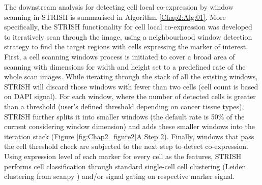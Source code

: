 The downstream analysis for detecting cell local co-expression by window scanning in STRISH is summarised in Algorithm \ref{Chap2:Alg:01}. More specifically, the STRISH functionality for cell local co-expression was developed to iteratively scan through the image, using a neighbourhood window detection strategy to find the target regions with cells expressing the marker of interest. First, a cell scanning windows process is initiated to cover a broad area of scanning with dimensions for width and height set to a predefined rate of the whole scan images. While iterating through the stack of all the existing windows, STRISH will discard those windows with fewer than two cells (cell count is based on DAPI signal). For each window, where the number of detected cells is greater than a threshold (user’s defined threshold depending on cancer tissue types), STRISH further splits it into smaller windows (the default rate is 50\% of the current considering window dimension) and adds these smaller windows into the iteration stack (Figure \ref{fig:Chap2_figure2}A Step 2). Finally, windows that pass the cell threshold check are subjected to the next step to detect co-expression. Using expression level of each marker for every cell as the features, STRISH performs cell classification through standard single-cell cell clustering (\ie Leiden clustering from scanpy \cite{wolf2018scanpy}) and/or signal gating on respective marker signal.
